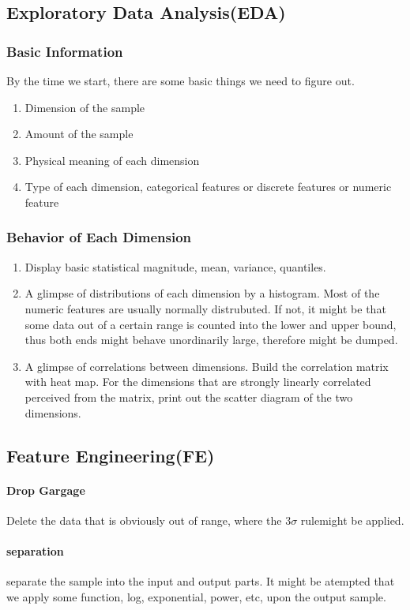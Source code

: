 \documentclass{article}
\begin{document}
\subsection{Exploratory Data Analysis(EDA)}
\subsubsection{Basic Information}
By the time we start, there are some basic things we need to figure out.
\begin{enumerate}
	\item Dimension of the sample
	\item Amount of the sample
	\item Physical meaning of each dimension
	\item Type of each dimension, categorical features or discrete features or numeric feature
\end{enumerate}
\subsubsection{Behavior of Each Dimension}
\begin{enumerate}
	\item Display basic statistical magnitude, mean, variance, quantiles.
	\item A glimpse of distributions of each dimension by a histogram. Most of the numeric features are usually normally distrubuted. If not, it might be that some data out of a certain range is counted into the lower and upper bound, thus both ends might behave unordinarily large, therefore might be dumped.
	\item A glimpse of correlations between dimensions. Build the correlation matrix with heat map. For the dimensions that are strongly linearly correlated perceived from the matrix, print out the scatter diagram of the two dimensions.
\end{enumerate}
\subsection{Feature Engineering(FE)}
	\paragraph{Drop Gargage}
	Delete the data that is obviously out of range, where the $3\sigma$ rulemight be applied.
	\paragraph{separation}
	separate the sample into the input and output parts. It might be atempted that we apply some function, log, exponential, power, etc, upon the output sample.
\end{document}
